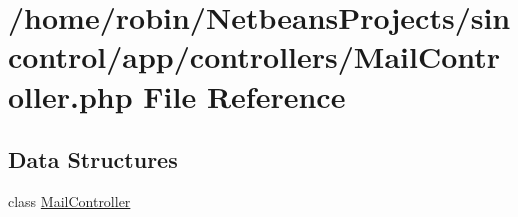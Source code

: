 \hypertarget{_mail_controller_8php}{}\section{/home/robin/\+Netbeans\+Projects/sincontrol/app/controllers/\+Mail\+Controller.php File Reference}
\label{_mail_controller_8php}
\subsection*{Data Structures}
\begin{DoxyCompactItemize}
\item 
class \hyperlink{class_mail_controller}{Mail\+Controller}
\end{DoxyCompactItemize}
